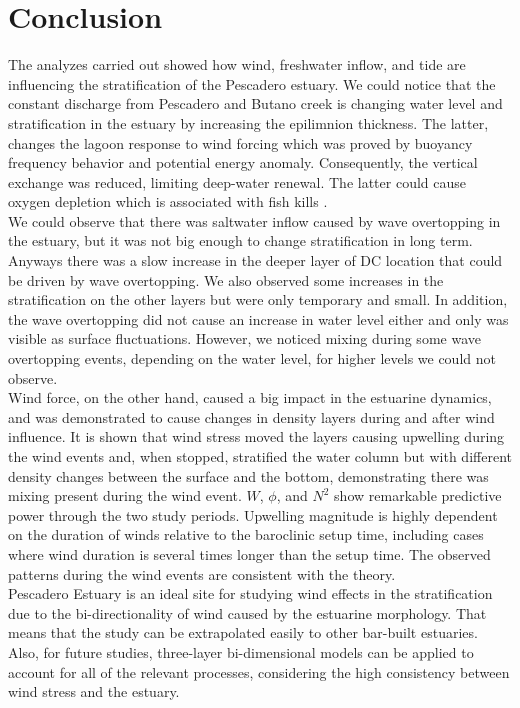 \documentclass[tesis.tex]{subfiles}
\begin{document}
  
\section{Conclusion}

The analyzes carried out showed how wind, freshwater inflow, and tide are influencing the stratification of the Pescadero estuary. We could notice that the constant discharge from Pescadero and Butano creek is changing water level and stratification in the estuary by increasing the epilimnion thickness. The latter, changes the lagoon response to wind forcing which was proved by buoyancy frequency behavior and potential energy anomaly. Consequently, the vertical exchange was reduced, limiting deep-water renewal. The latter could cause oxygen depletion which is associated with fish kills \citep{Kelly2018}.\\

We could observe that there was saltwater inflow caused by wave overtopping in the estuary, but it was not big enough to change stratification in long term. Anyways there was a slow increase in the deeper layer of DC location that could be driven by wave overtopping. We also observed some increases in the stratification on the other layers but were only temporary and small. In addition, the wave overtopping did not cause an increase in water level either and only was visible as surface fluctuations. However, we noticed mixing during some wave overtopping events, depending on the water level, for higher levels we could not observe.\\

Wind force, on the other hand, caused a big impact in the estuarine dynamics, and was demonstrated to cause changes in density layers during and after wind influence. It is shown that wind stress moved the layers causing upwelling during the wind events and, when stopped, stratified the water column but with different density changes between the surface and the bottom, demonstrating there was mixing present during the wind event. $W$, $\phi$, and $N^2$ show remarkable predictive power through the two study periods. Upwelling magnitude is highly dependent on the duration of winds relative to the baroclinic setup time, including cases where wind duration is several times longer than the setup time. The observed patterns during the wind events are consistent with the theory.\\

Pescadero Estuary is an ideal site for studying wind effects in the stratification due to the bi-directionality of wind caused by the estuarine morphology. That means that the study can be extrapolated easily to other bar-built estuaries. Also, for future studies, three-layer bi-dimensional models can be applied to account for all of the relevant processes, considering the high consistency between wind stress and the estuary.\\
\end{document}
